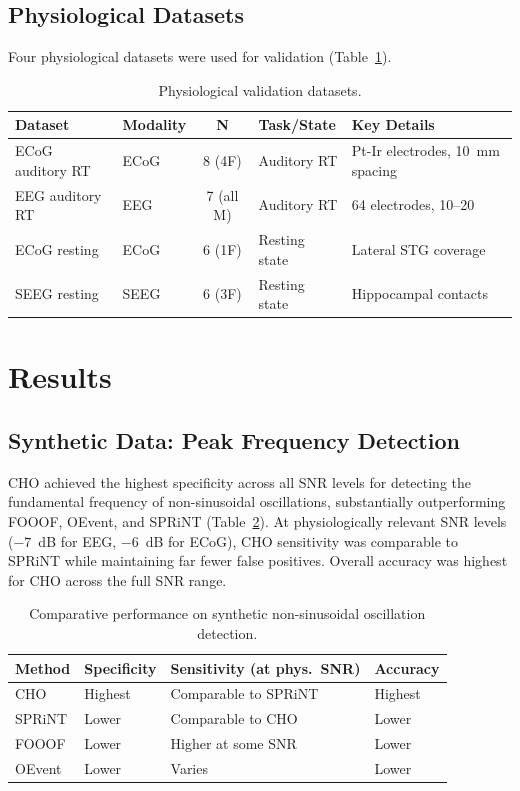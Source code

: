 \documentclass[12pt]{article}
\begin{document}
\subsection{Physiological Datasets}

Four physiological datasets were used for validation (Table~\ref{tab:datasets}).

\begin{table}[ht]
\centering
\caption{Physiological validation datasets.}
\label{tab:datasets}
\begin{tabular}{llcll}
\toprule
Dataset & Modality & N & Task/State & Key Details \\
\midrule
ECoG auditory RT & ECoG & 8 (4F) & Auditory RT & Pt-Ir electrodes, 10~mm spacing \\
EEG auditory RT & EEG & 7 (all M) & Auditory RT & 64 electrodes, 10--20 \\
ECoG resting & ECoG & 6 (1F) & Resting state & Lateral STG coverage \\
SEEG resting & SEEG & 6 (3F) & Resting state & Hippocampal contacts \\
\bottomrule
\end{tabular}
\end{table}

\section{Results}

\subsection{Synthetic Data: Peak Frequency Detection}

CHO achieved the highest specificity across all SNR levels for detecting the fundamental frequency of non-sinusoidal oscillations, substantially outperforming FOOOF, OEvent, and SPRiNT (Table~\ref{tab:synthetic}). At physiologically relevant SNR levels ($-7$~dB for EEG, $-6$~dB for ECoG), CHO sensitivity was comparable to SPRiNT while maintaining far fewer false positives. Overall accuracy was highest for CHO across the full SNR range.

\begin{table}[ht]
\centering
\caption{Comparative performance on synthetic non-sinusoidal oscillation detection.}
\label{tab:synthetic}
\begin{tabular}{llll}
\toprule
Method & Specificity & Sensitivity (at phys.\ SNR) & Accuracy \\
\midrule
CHO & Highest & Comparable to SPRiNT & Highest \\
SPRiNT & Lower & Comparable to CHO & Lower \\
FOOOF & Lower & Higher at some SNR & Lower \\
OEvent & Lower & Varies & Lower \\
\bottomrule
\end{tabular}
\end{table}
\end{document}
